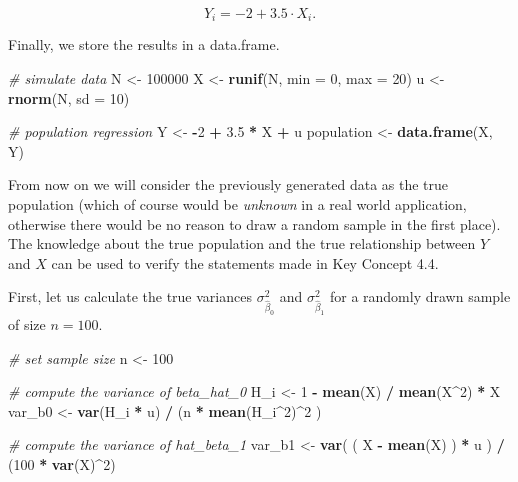 \documentclass[]{book}
\newenvironment{Shaded}{\begin{snugshade}}{\end{snugshade}}
\newcommand{\KeywordTok}[1]{\textcolor[rgb]{0.13,0.29,0.53}{\textbf{#1}}}
\newcommand{\DataTypeTok}[1]{\textcolor[rgb]{0.13,0.29,0.53}{#1}}
\newcommand{\DecValTok}[1]{\textcolor[rgb]{0.00,0.00,0.81}{#1}}
\newcommand{\FloatTok}[1]{\textcolor[rgb]{0.00,0.00,0.81}{#1}}
\newcommand{\StringTok}[1]{\textcolor[rgb]{0.31,0.60,0.02}{#1}}
\newcommand{\CommentTok}[1]{\textcolor[rgb]{0.56,0.35,0.01}{\textit{#1}}}
\newcommand{\OperatorTok}[1]{\textcolor[rgb]{0.81,0.36,0.00}{\textbf{#1}}}
\newcommand{\NormalTok}[1]{#1}
\theoremstyle{definition}
\theoremstyle{definition}
\theoremstyle{definition}
\theoremstyle{remark}
\begin{document}
\[ Y_i = -2 + 3.5 \cdot X_i. \]

Finally, we store the results in a data.frame.

\begin{Shaded}
\begin{Highlighting}[]
\CommentTok{# simulate data}
\NormalTok{N <-}\StringTok{ }\DecValTok{100000}
\NormalTok{X <-}\StringTok{ }\KeywordTok{runif}\NormalTok{(N, }\DataTypeTok{min =} \DecValTok{0}\NormalTok{, }\DataTypeTok{max =} \DecValTok{20}\NormalTok{)}
\NormalTok{u <-}\StringTok{ }\KeywordTok{rnorm}\NormalTok{(N, }\DataTypeTok{sd =} \DecValTok{10}\NormalTok{)}

\CommentTok{# population regression}
\NormalTok{Y <-}\StringTok{ }\OperatorTok{-}\DecValTok{2} \OperatorTok{+}\StringTok{ }\FloatTok{3.5} \OperatorTok{*}\StringTok{ }\NormalTok{X }\OperatorTok{+}\StringTok{ }\NormalTok{u}
\NormalTok{population <-}\StringTok{ }\KeywordTok{data.frame}\NormalTok{(X, Y)}
\end{Highlighting}
\end{Shaded}

From now on we will consider the previously generated data as the true
population (which of course would be \emph{unknown} in a real world
application, otherwise there would be no reason to draw a random sample
in the first place). The knowledge about the true population and the
true relationship between \(Y\) and \(X\) can be used to verify the
statements made in Key Concept 4.4.

First, let us calculate the true variances \(\sigma^2_{\hat{\beta}_0}\)
and \(\sigma^2_{\hat{\beta}_1}\) for a randomly drawn sample of size
\(n = 100\).

\begin{Shaded}
\begin{Highlighting}[]
\CommentTok{# set sample size}
\NormalTok{n <-}\StringTok{ }\DecValTok{100}

\CommentTok{# compute the variance of beta_hat_0}
\NormalTok{H_i <-}\StringTok{ }\DecValTok{1} \OperatorTok{-}\StringTok{ }\KeywordTok{mean}\NormalTok{(X) }\OperatorTok{/}\StringTok{ }\KeywordTok{mean}\NormalTok{(X}\OperatorTok{^}\DecValTok{2}\NormalTok{) }\OperatorTok{*}\StringTok{ }\NormalTok{X}
\NormalTok{var_b0 <-}\StringTok{ }\KeywordTok{var}\NormalTok{(H_i }\OperatorTok{*}\StringTok{ }\NormalTok{u) }\OperatorTok{/}\StringTok{ }\NormalTok{(n }\OperatorTok{*}\StringTok{ }\KeywordTok{mean}\NormalTok{(H_i}\OperatorTok{^}\DecValTok{2}\NormalTok{)}\OperatorTok{^}\DecValTok{2}\NormalTok{ )}

\CommentTok{# compute the variance of hat_beta_1}
\NormalTok{var_b1 <-}\StringTok{ }\KeywordTok{var}\NormalTok{( ( X }\OperatorTok{-}\StringTok{ }\KeywordTok{mean}\NormalTok{(X) ) }\OperatorTok{*}\StringTok{ }\NormalTok{u ) }\OperatorTok{/}\StringTok{ }\NormalTok{(}\DecValTok{100} \OperatorTok{*}\StringTok{ }\KeywordTok{var}\NormalTok{(X)}\OperatorTok{^}\DecValTok{2}\NormalTok{)}
\end{Highlighting}
\end{Shaded}
\end{document}
